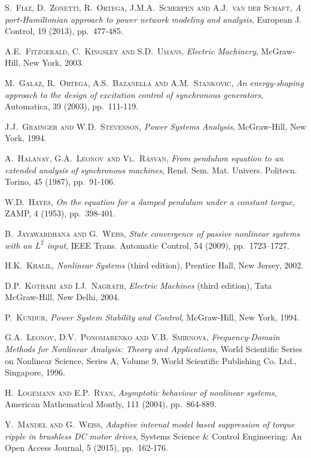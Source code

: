 \documentclass[12pt]{article}
\theoremstyle{definition}
\numberwithin{equation}{section}                        %
\newcommand{\m}      {{\hbox{\hskip 1pt}}}
\begin{document}
\begin{thebibliography}{99}
{
 \textsc{S.~Fiaz, D.~Zonetti, R.~Ortega, J.M.A.~Scherpen and A.J.~van
 der Schaft,} \m {\em A port-Hamiltonian approach to power network
 modeling and analysis}, European J. Control, 19 (2013), pp.~477-485.

 \textsc{A.E.~Fitzgerald, C.~Kingsley and S.D.~Umans,} \m {\em
 Electric Machinery}, \m McGraw-Hill, New York, 2003.

 \textsc{M.~Galaz, R.~Ortega, A.S.~Bazanella and A.M.~Stankovic}, \m
 {\em An energy-shaping approach to the design of excitation control
 of synchronous generators}, Automatica, 39 (2003), pp.~111-119.

 \textsc{J.J.~Grainger and W.D.~Stevenson,} \m {\em Power Systems
 Analysis}, \m McGraw-Hill, New York, 1994.

 \textsc{A.~Halanay, G.A.~Leonov and Vl.~R\u{a}svan,} \m {\em From
 pendulum equation to an extended analysis of synchronous machines},
 Rend. Sem. Mat.  Univers. Politecn. Torino, 45 (1987), pp.~91-106.

 \textsc{W.D.~Hayes,} \m {\em On the equation for a damped pendulum
 under a constant torque}, ZAMP, 4 (1953), pp.~398-401.

 \textsc{B.~Jayawardhana and G.~Weiss,} \m {\em State convergence of
 passive nonlinear systems with an $L^2$ input}, IEEE Trans. Automatic
 Control, 54 (2009), pp.~1723--1727.

 \textsc{H.K.~Khalil,} \m {\em Nonlinear Systems} (third edition), \m
 Prentice Hall, New Jersey, 2002.

 \textsc{D.P.~Kothari and I.J.~Nagrath}, \m {\em Electric Machines}
 (third edition), \m Tata McGraw-Hill, New Delhi, 2004.

 \textsc{P.~Kundur,} \m {\em Power System Stability and Control}, \m
 McGraw-Hill, New York, 1994.

 \textsc{G.A.~Leonov, D.V.~Ponomarenko and V.B.~Smirnova,} \m {\em
 Frequency-Domain Methods for Nonlinear Analysis: Theory and
 Applications}, \m World Scientific Series on Nonlinear Science,
 Series A, Volume 9, World Scientific Publishing Co. Ltd., Singapore,
 1996.

 \textsc{H.~Logemann and E.P.~Ryan,} \m {\em Asymptotic behaviour of
 nonlinear systems}, American Mathematical Montly, 111 (2004),
 pp.~864-889.

 \textsc{Y.~Mandel and G.~Weiss,} \m {\em Adaptive internal model
 based suppression of torque ripple in brushless DC motor drives},
 Systems Science \& Control Engineering: An Open Access Journal, 5
 (2015), pp.~162-176.

}
\end{thebibliography}
\end{document}
